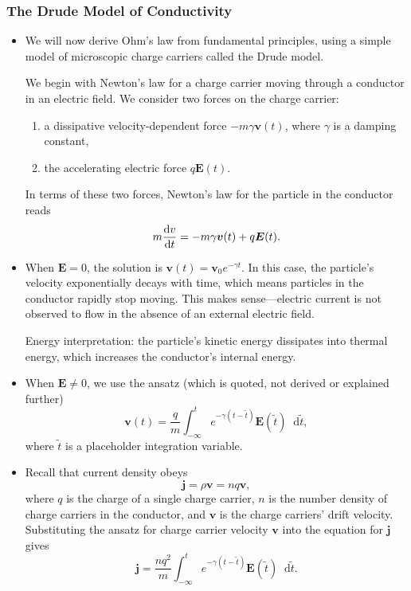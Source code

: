 \documentclass[11pt, a4paper]{article}
\newcommand{\diff}{\mathop{}\!\mathrm{d}} %
\renewcommand{\vec}[1]{\bm{#1}} %
\renewcommand{\t}[1]{\tilde{#1}} %
\newcommand{\E}{\vec{E}} %
\renewcommand{\j}{\vec{j}}  %
\begin{document}
\subsubsection{The Drude Model of Conductivity}
\begin{itemize}
	\item We will now derive Ohm's law from fundamental principles, using a simple model of microscopic charge carriers called the Drude model.
	
	We begin with Newton's law for a charge carrier moving through a conductor in an electric field. We consider two forces on the charge carrier:
	\begin{enumerate}
		\item a dissipative velocity-dependent force $ - m \gamma \vec{v}(t) $, where $ \gamma $ is a damping constant,
		
		\item the accelerating electric force $ q \E(t) $.
	\end{enumerate}
	In terms of these two forces, Newton's law for the particle in the conductor reads
	\begin{equation*}
		m \dv{v}{t} = - m \gamma \vec{v}(t) + q \E(t).
	\end{equation*}
	
	\item When $ \E = 0 $, the solution is $ \vec{v}(t) = \vec{v}_{0} e^{- \gamma t}$. In this case, the particle's velocity exponentially decays with time, which means particles in the conductor rapidly stop moving. This makes sense---electric current is not observed to flow in the absence of an external electric field.
	
	Energy interpretation: the particle's kinetic energy dissipates into thermal energy, which increases the conductor's internal energy.
	
	\item When $ \E \neq 0 $, we use the ansatz (which is quoted, not derived or explained further)
	\begin{equation*}
		\vec{v}(t) = \frac{q}{m}\int_{-\infty}^{t}e^{-\gamma(t - \t{t})}\E(\t{t}) \diff \t{t},
	\end{equation*}
    where $ \tilde{t} $ is a placeholder integration variable.
	
    \item Recall that current density obeys
	\begin{equation*}
		\j = \rho \vec{v} = n q \vec{v},
	\end{equation*}
	where $ q $ is the charge of a single charge carrier, $ n $ is the number density of charge carriers in the conductor, and $ \vec{v} $ is the charge carriers' drift velocity. Substituting the ansatz for charge carrier velocity $ \vec{v} $ into the equation for $ \j $ gives
	\begin{equation*}
		\j = \frac{nq^{2}}{m}\int_{-\infty}^{t}e^{-\gamma(t - \t{t})}\E(\t{t}) \diff \t{t}.
	\end{equation*}
	

\end{itemize}
\end{document}
